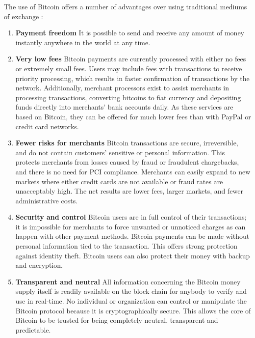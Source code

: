 \documentclass{acm_proc_article-sp}
\begin{document}
The use of Bitcoin offers a number of advantages over using traditional mediums of exchange \cite{Bitcoin:2014}:

\begin{enumerate}
	\item \textbf{Payment freedom} It is possible to send and receive any amount of money instantly anywhere in the world at any time.
	\item \textbf{Very low fees} Bitcoin payments are currently processed with either no fees or extremely small fees. Users may include fees with transactions to receive priority processing, which results in faster confirmation of transactions by the network. Additionally, merchant processors exist to assist merchants in processing transactions, converting bitcoins to fiat currency and depositing funds directly into merchants' bank accounts daily. As these services are based on Bitcoin, they can be offered for much lower fees than with PayPal or credit card networks.
	\item \textbf{Fewer risks for merchants} Bitcoin transactions are secure, irreversible, and do not contain customers’ sensitive or personal information. This protects merchants from losses caused by fraud or fraudulent chargebacks, and there is no need for PCI compliance. Merchants can easily expand to new markets where either credit cards are not available or fraud rates are unacceptably high. The net results are lower fees, larger markets, and fewer administrative costs.
	\item \textbf{Security and control} Bitcoin users are in full control of their transactions; it is impossible for merchants to force unwanted or unnoticed charges as can happen with other payment methods. Bitcoin payments can be made without personal information tied to the transaction. This offers strong protection against identity theft. Bitcoin users can also protect their money with backup and encryption.
	\item \textbf{Transparent and neutral} All information concerning the Bitcoin money supply itself is readily available on the block chain for anybody to verify and use in real-time. No individual or organization can control or manipulate the Bitcoin protocol because it is cryptographically secure. This allows the core of Bitcoin to be trusted for being completely neutral, transparent and predictable.
\end{enumerate}
\end{document}
